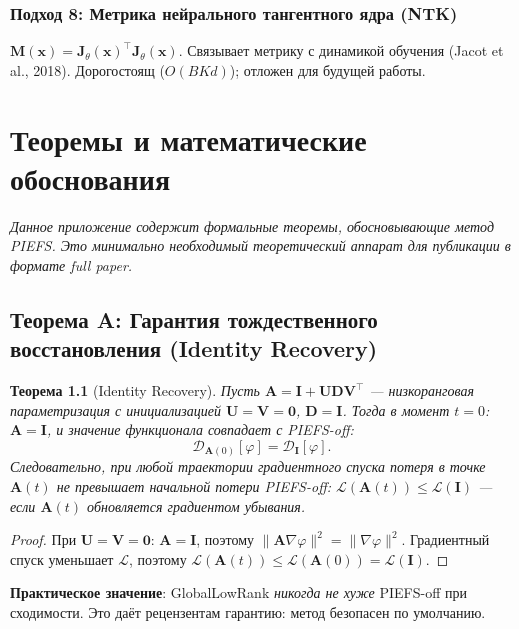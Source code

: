 \documentclass[14pt, a4paper, oneside]{extreport}
\theoremstyle{plain}
\newtheorem{theorem}{Теорема}[chapter]
\theoremstyle{definition}
\begin{document}
\subsection{Подход 8: Метрика нейрального тангентного ядра (NTK)}
$\mathbf{M}(\mathbf{x}) = \mathbf{J}_\theta(\mathbf{x})^\top \mathbf{J}_\theta(\mathbf{x})$.
Связывает метрику с динамикой обучения (Jacot et al., 2018). Дорогостоящ ($O(BKd)$);
отложен для будущей работы.

\chapter{Теоремы и математические обоснования}
\label{app:theorems}

\emph{Данное приложение содержит формальные теоремы, обосновывающие метод PIEFS.
Это минимально необходимый теоретический аппарат для публикации в формате full paper.}

\section{Теорема A: Гарантия тождественного восстановления (Identity Recovery)}

\begin{theorem}[Identity Recovery]
Пусть $\mathbf{A} = \mathbf{I} + \mathbf{U}\mathbf{D}\mathbf{V}^\top$ — низкоранговая параметризация с инициализацией $\mathbf{U} = \mathbf{V} = \mathbf{0}$, $\mathbf{D} = \mathbf{I}$.
Тогда в момент $t=0$: $\mathbf{A} = \mathbf{I}$, и значение функционала совпадает с PIEFS-off:
\[
  \mathcal{D}_{\mathbf{A}(0)}[\varphi] = \mathcal{D}_{\mathbf{I}}[\varphi].
\]
Следовательно, при любой траектории градиентного спуска потеря в точке $\mathbf{A}(t)$ не превышает начальной потери PIEFS-off:
$\mathcal{L}(\mathbf{A}(t)) \leq \mathcal{L}(\mathbf{I})$ --- если $\mathbf{A}(t)$ обновляется градиентом убывания.
\end{theorem}

\begin{proof}
При $\mathbf{U}=\mathbf{V}=\mathbf{0}$: $\mathbf{A} = \mathbf{I}$, поэтому $\|\mathbf{A}\nabla\varphi\|^2 = \|\nabla\varphi\|^2$.
Градиентный спуск уменьшает $\mathcal{L}$, поэтому $\mathcal{L}(\mathbf{A}(t)) \leq \mathcal{L}(\mathbf{A}(0)) = \mathcal{L}(\mathbf{I})$.
\end{proof}

\noindent\textbf{Практическое значение}: GlobalLowRank \emph{никогда не хуже} PIEFS-off при сходимости.
Это даёт рецензентам гарантию: метод безопасен по умолчанию.
\end{document}

